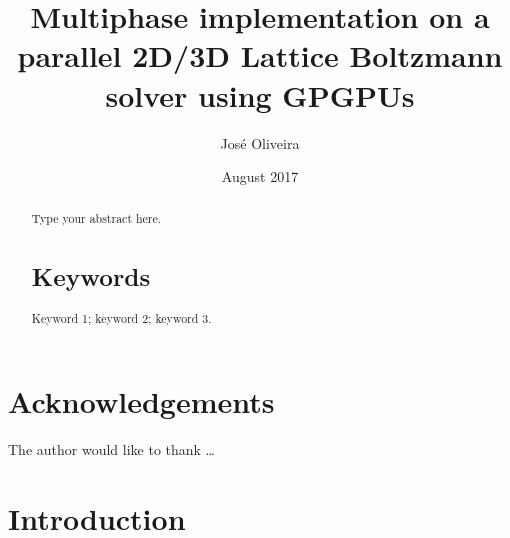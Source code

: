 \documentclass[12pt]{book}
\title{Multiphase implementation on a parallel 2D/3D Lattice Boltzmann solver
	using GPGPUs}
\author{José Oliveira}
\date{August 2017}
\begin{document}
%
%

\frontmatter

\maketitle

\begin{abstract}
    Type your abstract here.
    \section*{Keywords}
    Keyword 1; keyword 2; keyword 3.
\end{abstract}

\sstableofcontents

\sslistoffigures

\sslistoftables

\begin{listofabbreviations}
\end{listofabbreviations}

\chapter{Acknowledgements}
The author would like to thank \dots

%
%
\mainmatter

\chapter{Introduction}
\end{document}
